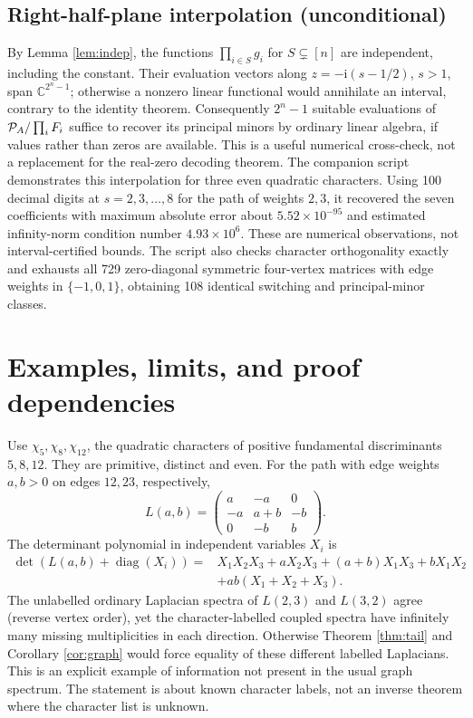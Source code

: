 \documentclass[11pt]{article}
\theoremstyle{definition}\newtheorem{definition}[theorem]{Definition}
\newcommand{\C}{\mathbb C}\newcommand{\R}{\mathbb R}\newcommand{\N}{\mathbb N}
\newcommand{\ii}{\mathrm i}\newcommand{\diag}{\operatorname{diag}}
\begin{document}
\subsection{Right-half-plane interpolation (unconditional)}
By Lemma \ref{lem:indep}, the functions $\prod_{i\in S}g_i$ for $S\subsetneq[n]$ are independent, including the constant. Their evaluation vectors along $z=-\ii(s-1/2)$, $s>1$, span $\C^{2^n-1}$; otherwise a nonzero linear functional would annihilate an interval, contrary to the identity theorem. Consequently $2^n-1$ suitable evaluations of $\mathcal P_A/\prod_iF_i$ suffice to recover its principal minors by ordinary linear algebra, if values rather than zeros are available. This is a useful numerical cross-check, not a replacement for the real-zero decoding theorem. The companion script demonstrates this interpolation for three even quadratic characters. Using 100 decimal digits at $s=2,3,\ldots,8$ for the path of weights $2,3$, it recovered the seven coefficients with maximum absolute error about $5.52\times10^{-95}$ and estimated infinity-norm condition number $4.93\times10^6$. These are numerical observations, not interval-certified bounds. The script also checks character orthogonality exactly and exhausts all 729 zero-diagonal symmetric four-vertex matrices with edge weights in $\{-1,0,1\}$, obtaining 108 identical switching and principal-minor classes.

\section{Examples, limits, and proof dependencies}
Use $\chi_5,\chi_8,\chi_{12}$, the quadratic characters of positive fundamental discriminants $5,8,12$. They are primitive, distinct and even. For the path with edge weights $a,b>0$ on edges $12,23$, respectively,
\[
 L(a,b)=\begin{pmatrix}a&-a&0\\-a&a+b&-b\\0&-b&b\end{pmatrix}.
\]
The determinant polynomial in independent variables $X_i$ is
\begin{align*}
 \det(L(a,b)+\diag(X_i))={}&X_1X_2X_3+aX_2X_3+(a+b)X_1X_3+bX_1X_2\\
 &+ab(X_1+X_2+X_3).
\end{align*}
The unlabelled ordinary Laplacian spectra of $L(2,3)$ and $L(3,2)$ agree (reverse vertex order), yet the character-labelled coupled spectra have infinitely many missing multiplicities in each direction. Otherwise Theorem \ref{thm:tail} and Corollary \ref{cor:graph} would force equality of these different labelled Laplacians. This is an explicit example of information not present in the usual graph spectrum. The statement is about known character labels, not an inverse theorem where the character list is unknown.
\end{document}
